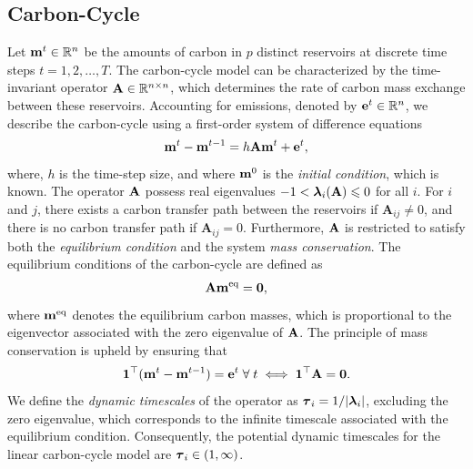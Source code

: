 \documentclass[11pt, a4paper, pdftex, twoside, dvipsnames]{article}
\newcommand{\bb}[1]{\boldsymbol{\bold{#1}}}
\begin{document}
\subsection{Carbon-Cycle}
Let $\bb{m}^t \in \mathbb{R}^{n}$ be the amounts of carbon in $p$ distinct reservoirs at discrete time steps $t = 1, 2, \ldots, T$. 
The carbon-cycle model can be characterized by the time-invariant operator $\bb{A} \in \mathbb{R}^{n \times n}$, which determines the rate of carbon mass exchange between these reservoirs. 
Accounting for emissions, denoted by $\bb{e}^t \in \mathbb{R}^{n}$, we describe the carbon-cycle using a first-order system of difference equations
%
\begin{align} \label{eq:clim_model.1}
    \bb{m}^t -\bb{m}^{t-1}  = h\bb{A}\bb{m}^t +\bb{e}^{t},
\end{align}
%
where, $h$ is the time-step size, and where $\bb{m}^{0}$ is the \textit{initial condition}, which is known. 
The operator $\bb{A}$ possess real eigenvalues $-1 < \bb{\lambda}_i(\bb{A}) \leqslant 0$ for all $i$. 
For $i$ and $j$, there exists a carbon transfer path between the reservoirs if $\mathbf{A}_{ij} \neq 0$, and there is no carbon transfer path if $\mathbf{A}_{ij}=0$.
Furthermore, $\bb{A}$ is restricted to satisfy both the \textit{equilibrium condition} and the system \textit{mass conservation}. 
The equilibrium conditions of the carbon-cycle are defined as
%
\begin{align}\label{eq:clim_model.2}
    \bb{A}\bb{m}^{\text{eq}}=\bb{0},
\end{align}
%
where $\bb{m}^{\text{eq}}$ denotes the equilibrium carbon masses, which is proportional to the eigenvector associated with the zero eigenvalue of $\bb{A}$. 
The principle of mass conservation is upheld by ensuring that
%
\begin{align}\label{eq:clim_model.3}
    \bb{1}^\top (\bb{m}^{t}-\bb{m}^{t-1})= \bb{e}^{t}\; \forall \; t \iff \bb{1}^\top \bb{A} =\bb{0}.
\end{align}
%
We define the \textit{dynamic timescales} of the operator as $\bb{\tau}_i = 1/|\bb{\lambda}_i|$, excluding the zero eigenvalue, which corresponds to the infinite timescale associated with the equilibrium condition. 
Consequently, the potential dynamic timescales for the linear carbon-cycle model are $\bb{\tau}_i \in (1,\infty)$. 
\end{document}
